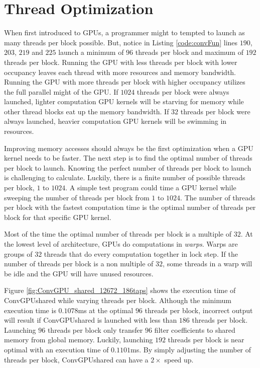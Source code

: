 \section{Thread Optimization}
When first introduced to GPUs, a programmer might to tempted to launch as many threads per block possible.
But, notice in Listing \ref{code:convFun} lines $190$, $203$, $219$ and $225$ launch a minimum of $96$ threads per block and maximum of $192$ threads per block.
Running the GPU with less threads per block with lower occupancy leaves each thread with more resources and memory bandwidth.
Running the GPU with more threads per block with higher occupancy utilizes the full parallel might of the GPU.
If $1024$ threads per block were always launched, lighter computation GPU kernels will be starving for memory while other thread blocks eat up the memory bandwidth.
If $32$ threads per block were always launched, heavier computation GPU kernels will be swimming in resources.

Improving memory accesses should always be the first optimization when a GPU kernel needs to be faster.
The next step is to find the optimal number of threads per block to launch.
Knowing the perfect number of threads per block to launch is challenging to calculate.
Luckily, there is a finite number of possible threads per block, $1$ to $1024$.
A simple test program could time a GPU kernel while sweeping the number of threads per block from $1$ to $1024$.
The number of threads per block with the fastest computation time is the optimal number of threads per block for that specific GPU kernel.

Most of the time the optimal number of threads per block is a multiple of $32$. 
At the lowest level of architecture, GPUs do computations in \textit{warps}.
Warps are groups of $32$ threads that do every computation together in lock step.
If the number of threads per block is a non multiple of $32$, some threads in a warp will be idle and the GPU will have unused resources.

Figure \ref{fig:ConvGPU_shared_12672_186taps} shows the execution time of ConvGPUshared while varying threads per block.
Although the minimum execution time is $0.1078$ms at the optimal $96$ threads per block, incorrect output will result if ConvGPUshared is launched with less than $186$ threads per block.
Launching $96$ threads per block only transfer $96$ filter coefficients to shared memory from global memory.
Luckily, launching $192$ threads per block is near optimal with an execution time of $0.1101$ms.
By simply adjusting the number of threads per block, ConvGPUshared can have a $2\times$ speed up.

